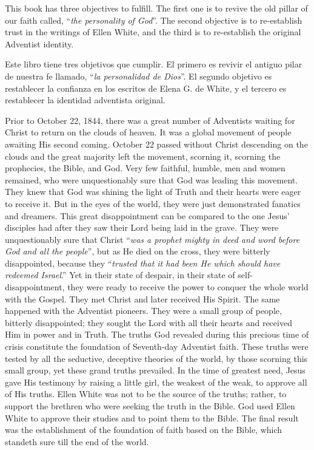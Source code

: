 







This book has three objectives to fulfill. The first one is to revive the old pillar of our faith called, “\textit{the personality of God}”. The second objective is to re-establish trust in the writings of Ellen White, and the third is to re-establish the original Adventist identity.


Este libro tiene tres objetivos que cumplir. El primero es revivir el antiguo pilar de nuestra fe llamado, “\textit{la personalidad de Dios}”. El segundo objetivo es restablecer la confianza en los escritos de Elena G. de White, y el tercero es restablecer la identidad adventista original.


Prior to October 22, 1844, there was a great number of Adventists waiting for Christ to return on the clouds of heaven. It was a global movement of people awaiting His second coming. October 22 passed without Christ descending on the clouds and the great majority left the movement, scorning it, scorning the prophecies, the Bible, and God. Very few faithful, humble, men and women remained, who were unquestionably sure that God was leading this movement. They knew that God was shining the light of Truth and their hearts were eager to receive it. But in the eyes of the world, they were just demonstrated fanatics and dreamers. This great disappointment can be compared to the one Jesus’ disciples had after they saw their Lord being laid in the grave. They were unquestionably sure that Christ “\textit{was a prophet mighty in deed and word before God and all the people}”, but as He died on the cross, they were bitterly disappointed, because they “\textit{trusted that it had been He which should have redeemed Israel}.” Yet in their state of despair, in their state of self-disappointment, they were ready to receive the power to conquer the whole world with the Gospel. They met Christ and later received His Spirit. The same happened with the Adventist pioneers. They were a small group of people, bitterly disappointed; they sought the Lord with all their hearts and received Him in power and in Truth. The truths God revealed during this precious time of crisis constitute the foundation of Seventh-day Adventist faith. These truths were tested by all the seductive, deceptive theories of the world, by those scorning this small group, yet these grand truths prevailed. In the time of greatest need, Jesus gave His testimony by raising a little girl, the weakest of the weak, to approve all of His truths. Ellen White was not to be the source of the truths; rather, to support the brethren who were seeking the truth in the Bible. God used Ellen White to approve their studies and to point them to the Bible. The final result was the establishment of the foundation of faith based on the Bible, which standeth sure till the end of the world.


